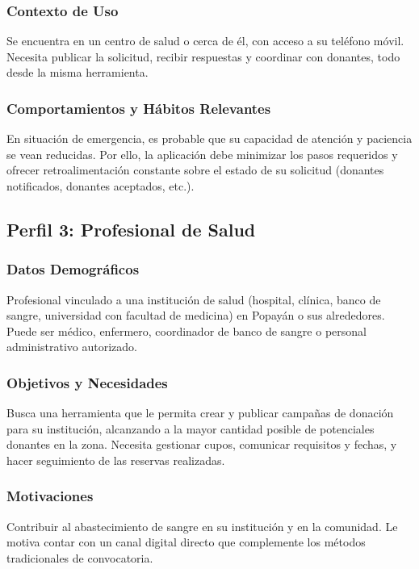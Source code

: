 \documentclass[12pt, a4paper]{article}
\begin{document}
\subsubsection{Contexto de Uso}
Se encuentra en un centro de salud o cerca de él, con acceso a su teléfono móvil. Necesita publicar la solicitud, recibir respuestas y coordinar con donantes, todo desde la misma herramienta.

\subsubsection{Comportamientos y Hábitos Relevantes}
En situación de emergencia, es probable que su capacidad de atención y paciencia se vean reducidas. Por ello, la aplicación debe minimizar los pasos requeridos y ofrecer retroalimentación constante sobre el estado de su solicitud (donantes notificados, donantes aceptados, etc.).

\subsection{Perfil 3: Profesional de Salud}

\subsubsection{Datos Demográficos}
Profesional vinculado a una institución de salud (hospital, clínica, banco de sangre, universidad con facultad de medicina) en Popayán o sus alrededores. Puede ser médico, enfermero, coordinador de banco de sangre o personal administrativo autorizado.

\subsubsection{Objetivos y Necesidades}
Busca una herramienta que le permita crear y publicar campañas de donación para su institución, alcanzando a la mayor cantidad posible de potenciales donantes en la zona. Necesita gestionar cupos, comunicar requisitos y fechas, y hacer seguimiento de las reservas realizadas.

\subsubsection{Motivaciones}
Contribuir al abastecimiento de sangre en su institución y en la comunidad. Le motiva contar con un canal digital directo que complemente los métodos tradicionales de convocatoria.
\end{document}
